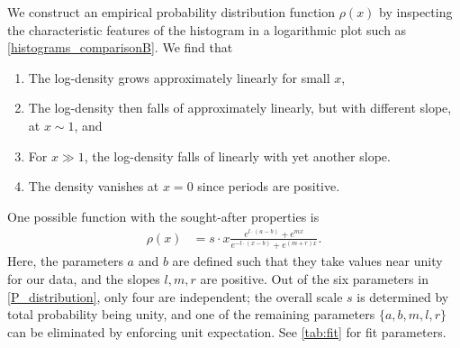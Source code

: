 \documentclass[12pt,a4paper]{article}
\renewcommand{\|}{\rule[-0.4ex]{0.2ex}{1.2em}}
\begin{document}
We construct an empirical probability distribution function $\rho(x)$ by inspecting the characteristic features of the histogram in a logarithmic plot such as \cref{histograms_comparisonB}. We find that 
\begin{enumerate}
	\item The log-density grows approximately linearly for small $x$,
	\item The log-density then falls of approximately linearly, but with different slope, at $x \sim 1$, and
	\item For $x \gg 1$, the log-density falls of linearly with yet another slope.
	\item The density vanishes at $x=0$ since periods are positive.
\end{enumerate}
One possible function with the sought-after properties is
\begin{align}\label{P_distribution}
\rho(x) &= s \cdot x \frac{e^{l\cdot (a-b)  } + e^{m x}}{e^{-l \cdot (x-b)} + e^{(m+r)x}}.
\end{align}
Here, the parameters $a$ and $b$ are defined such that they take values near unity for our data, and the slopes $l,m,r$ are positive.
Out of the six parameters in \cref{P_distribution}, only four are independent; the overall scale $s$ is determined by total  probability being unity,
and one of the remaining parameters $\{a,b,m,l,r\}$  can be eliminated by enforcing unit expectation.   See \cref{tab:fit} for fit parameters.
\end{document}
